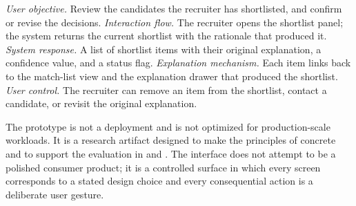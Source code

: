 \emph{User objective.} Review the candidates the recruiter has shortlisted, and confirm or revise the decisions.
\emph{Interaction flow.} The recruiter opens the shortlist panel; the system returns the current shortlist with the rationale that produced it.
\emph{System response.} A list of shortlist items with their original explanation, a confidence value, and a status flag.
\emph{Explanation mechanism.} Each item links back to the match-list view and the explanation drawer that produced the shortlist.
\emph{User control.} The recruiter can remove an item from the shortlist, contact a candidate, or revisit the original explanation.

The prototype is not a deployment and is not optimized for production-scale workloads.
It is a research artifact designed to make the principles of  concrete and to support the evaluation in  and .
The interface does not attempt to be a polished consumer product; it is a controlled surface in which every screen corresponds to a stated design choice and every consequential action is a deliberate user gesture.
